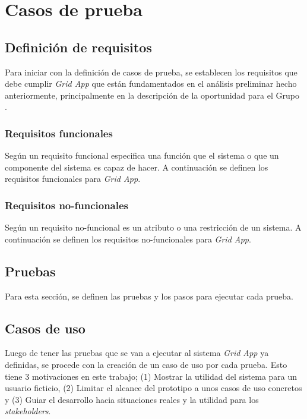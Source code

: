 \section{Casos de prueba}

\subsection{Definición de requisitos}
\noindent
Para iniciar con la definición de casos de prueba, se establecen los requisitos que debe cumplir \textit{Grid App} que están fundamentados en el análisis preliminar hecho anteriormente, principalmente en la descripción de la oportunidad para el Grupo \GRID.

\subsubsection{Requisitos funcionales}
\noindent
Según \cite{159342} un requisito funcional especifica una función que el sistema o que un componente del sistema es capaz de hacer. A continuación se definen los requisitos funcionales para \textit{Grid App}.


\subsubsection{Requisitos no-funcionales}
\noindent
Según \cite{4384163} un requisito no-funcional es un atributo o una restricción de un sistema. A continuación se definen los requisitos no-funcionales para \textit{Grid App}.


\subsection{Pruebas}
\noindent
Para esta sección, se definen las pruebas y los pasos para ejecutar cada prueba.


\subsection{Casos de uso}
\noindent
Luego de tener las pruebas que se van a ejecutar al sistema \textit{Grid App} ya definidas, se procede con la creación de un caso de uso por cada prueba. Esto tiene 3 motivaciones en este trabajo; (1) Mostrar la utilidad del sistema para un usuario ficticio, (2) Limitar el alcance del prototipo a unos casos de uso concretos y (3) Guiar el desarrollo hacia situaciones reales y la utilidad para los \textit{stakeholders}.

